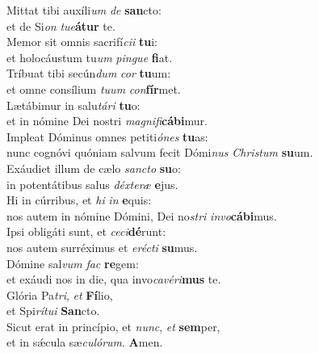 \evenverse Mittat tibi auxíli\textit{um} \textit{de} \textbf{san}cto:~\*\\
\evenverse et de Si\textit{on} \textit{tu}\textit{e}\textbf{á}\textbf{tur} te.\\
\oddverse Memor sit omnis sacrifí\textit{ci}\textit{i} \textbf{tu}i:~\*\\
\oddverse et holocáustum tu\textit{um} \textit{pin}\textit{gue} \textbf{fi}at.\\
\evenverse Tríbuat tibi secún\textit{dum} \textit{cor} \textbf{tu}um:~\*\\
\evenverse et omne consílium \textit{tu}\textit{um} \textit{con}\textbf{fír}met.\\
\oddverse Lætábimur in salu\textit{tá}\textit{ri} \textbf{tu}o:~\*\\
\oddverse et in nómine Dei nostri \textit{ma}\textit{gni}\textit{fi}\textbf{cá}\textbf{bi}mur.\\
\evenverse Impleat Dóminus omnes petiti\textit{ó}\textit{nes} \textbf{tu}as:~\*\\
\evenverse nunc cognóvi quóniam salvum fecit Dómi\textit{nus} \textit{Chri}\textit{stum} \textbf{su}um.\\
\oddverse Exáudiet illum de cælo \textit{san}\textit{cto} \textbf{su}o:~\*\\
\oddverse in potentátibus salus \textit{déx}\textit{te}\textit{ræ} \textbf{e}jus.\\
\evenverse Hi in cúrribus, et \textit{hi} \textit{in} \textbf{e}quis:~\*\\
\evenverse nos autem in nómine Dómini, Dei no\textit{stri} \textit{in}\textit{vo}\textbf{cá}\textbf{bi}mus.\\
\oddverse Ipsi obligáti sunt, et \textit{ce}\textit{ci}\textbf{dé}runt:~\*\\
\oddverse nos autem surréximus et \textit{e}\textit{ré}\textit{cti} \textbf{su}mus.\\
\evenverse Dómine sal\textit{vum} \textit{fac} \textbf{re}gem:~\*\\
\evenverse et exáudi nos in die, qua invo\textit{ca}\textit{vé}\textit{ri}\textbf{mus} te.\\
\oddverse Glória Pa\textit{tri}, \textit{et} \textbf{Fí}lio,~\*\\
\oddverse et Spi\textit{rí}\textit{tu}\textit{i} \textbf{San}cto.\\
\evenverse Sicut erat in princípio, et \textit{nunc}, \textit{et} \textbf{sem}per,~\*\\
\evenverse et in sǽcula sæ\textit{cu}\textit{ló}\textit{rum}. \textbf{A}men.\\
